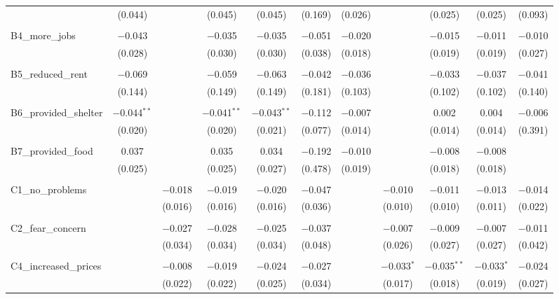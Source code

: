 \begin{table}[H]
\begin{tabular}{@{\extracolsep{4pt}}lcccccccccc}
  & (0.044) &  & (0.045) & (0.045) & (0.169) & (0.026) &  & (0.025) & (0.025) & (0.093) \\ 
  & & & & & & & & & & \\ 
 B4\_more\_jobs & $-$0.043 &  & $-$0.035 & $-$0.035 & $-$0.051 & $-$0.020 &  & $-$0.015 & $-$0.011 & $-$0.010 \\ 
  & (0.028) &  & (0.030) & (0.030) & (0.038) & (0.018) &  & (0.019) & (0.019) & (0.027) \\ 
  & & & & & & & & & & \\ 
 B5\_reduced\_rent & $-$0.069 &  & $-$0.059 & $-$0.063 & $-$0.042 & $-$0.036 &  & $-$0.033 & $-$0.037 & $-$0.041 \\ 
  & (0.144) &  & (0.149) & (0.149) & (0.181) & (0.103) &  & (0.102) & (0.102) & (0.140) \\ 
  & & & & & & & & & & \\ 
 B6\_provided\_shelter & $-$0.044$^{**}$ &  & $-$0.041$^{**}$ & $-$0.043$^{**}$ & $-$0.112 & $-$0.007 &  & 0.002 & 0.004 & $-$0.006 \\ 
  & (0.020) &  & (0.020) & (0.021) & (0.077) & (0.014) &  & (0.014) & (0.014) & (0.391) \\ 
  & & & & & & & & & & \\ 
 B7\_provided\_food & 0.037 &  & 0.035 & 0.034 & $-$0.192 & $-$0.010 &  & $-$0.008 & $-$0.008 &  \\ 
  & (0.025) &  & (0.025) & (0.027) & (0.478) & (0.019) &  & (0.018) & (0.018) &  \\ 
  & & & & & & & & & & \\ 
 C1\_no\_problems &  & $-$0.018 & $-$0.019 & $-$0.020 & $-$0.047 &  & $-$0.010 & $-$0.011 & $-$0.013 & $-$0.014 \\ 
  &  & (0.016) & (0.016) & (0.016) & (0.036) &  & (0.010) & (0.010) & (0.011) & (0.022) \\ 
  & & & & & & & & & & \\ 
 C2\_fear\_concern &  & $-$0.027 & $-$0.028 & $-$0.025 & $-$0.037 &  & $-$0.007 & $-$0.009 & $-$0.007 & $-$0.011 \\ 
  &  & (0.034) & (0.034) & (0.034) & (0.048) &  & (0.026) & (0.027) & (0.027) & (0.042) \\ 
  & & & & & & & & & & \\ 
 C4\_increased\_prices &  & $-$0.008 & $-$0.019 & $-$0.024 & $-$0.027 &  & $-$0.033$^{*}$ & $-$0.035$^{**}$ & $-$0.033$^{*}$ & $-$0.024 \\ 
  &  & (0.022) & (0.022) & (0.025) & (0.034) &  & (0.017) & (0.018) & (0.019) & (0.027) \\ 

\end{tabular}
\end{table}

